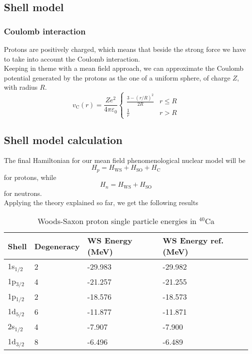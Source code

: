 \subsection{Shell model}
\subsubsection{Coulomb interaction}
Protons are positively charged, which means that beside the strong force we have to take into account the Coulomb interaction.
\\Keeping in theme with a mean field approach, we can approximate the Coulomb potential generated by the protons as the one of a uniform sphere, of charge $Z$, with radius $R$.
\begin{equation}
    v_{\text{C}}(r) = \frac{Ze^2}{4\pi\varepsilon_0} 
    \begin{cases}
        \frac{3-(r/R)^2}{2R} & r \le R \\
        \frac 1 r & r > R
    \end{cases}
\end{equation}
\subsection{Shell model calculation}
The final Hamiltonian for our mean field phenomenological nuclear model will be
\begin{equation}
    H_p = H_\text{WS} + H_\text{SO} + H_\text{C}
\end{equation}
for protons, while
\begin{equation}
    H_n = H_\text{WS} + H_\text{SO} 
\end{equation}
for neutrons.
\\Applying the theory explained so far, we get the following results

\begin{table}
   
\centering
\caption{Woods-Saxon proton single particle energies in $^\text{40}$Ca}
\begin{tabular}{@{}llll@{}}
\toprule
Shell         & Degeneracy & WS Energy (MeV)& WS Energy ref. (MeV)\\ \midrule
1s$_{1/2}$    & 2          & -29.983        & -29.982\\
1p$_{3/2}$    & 4          & -21.257        & -21.255\\
1p$_{1/2}$    & 2          & -18.576        & -18.573 \\
1d$_{5/2}$    & 6          & -11.877        & -11.871\\
2s$_{1/2}$    & 4          & -7.907         & -7.900\\
1d$_{3/2}$    & 8          & -6.496         & -6.489\\
\bottomrule
\end{tabular}
\end{table}


